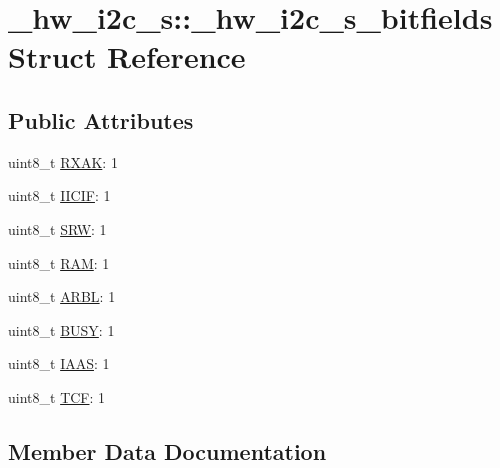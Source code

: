 \hypertarget{struct__hw__i2c__s_1_1__hw__i2c__s__bitfields}{}\section{\+\_\+hw\+\_\+i2c\+\_\+s\+:\+:\+\_\+hw\+\_\+i2c\+\_\+s\+\_\+bitfields Struct Reference}
\label{struct__hw__i2c__s_1_1__hw__i2c__s__bitfields}
\subsection*{Public Attributes}
\begin{DoxyCompactItemize}
\item 
uint8\+\_\+t \hyperlink{struct__hw__i2c__s_1_1__hw__i2c__s__bitfields_a77f49eeba077259e1cc71a45b59d7fa1}{R\+X\+AK}\+: 1
\item 
uint8\+\_\+t \hyperlink{struct__hw__i2c__s_1_1__hw__i2c__s__bitfields_a95cd32a1fe286a724c19d69bc45303c3}{I\+I\+C\+IF}\+: 1
\item 
uint8\+\_\+t \hyperlink{struct__hw__i2c__s_1_1__hw__i2c__s__bitfields_aa5f35708b5d39be16a6325922cf87003}{S\+RW}\+: 1
\item 
uint8\+\_\+t \hyperlink{struct__hw__i2c__s_1_1__hw__i2c__s__bitfields_adcac181f397a53743c5d59e22424c3d0}{R\+AM}\+: 1
\item 
uint8\+\_\+t \hyperlink{struct__hw__i2c__s_1_1__hw__i2c__s__bitfields_ad62d302c7e33b8c96d3578b247adf043}{A\+R\+BL}\+: 1
\item 
uint8\+\_\+t \hyperlink{struct__hw__i2c__s_1_1__hw__i2c__s__bitfields_ae9e610b518e6ec527997eb078cc5b6f1}{B\+U\+SY}\+: 1
\item 
uint8\+\_\+t \hyperlink{struct__hw__i2c__s_1_1__hw__i2c__s__bitfields_a8416d3902e4875f2c7711a22a43fa3fe}{I\+A\+AS}\+: 1
\item 
uint8\+\_\+t \hyperlink{struct__hw__i2c__s_1_1__hw__i2c__s__bitfields_ac88b5b400303c5625bd9cbe0c053d540}{T\+CF}\+: 1
\end{DoxyCompactItemize}


\subsection{Member Data Documentation}
